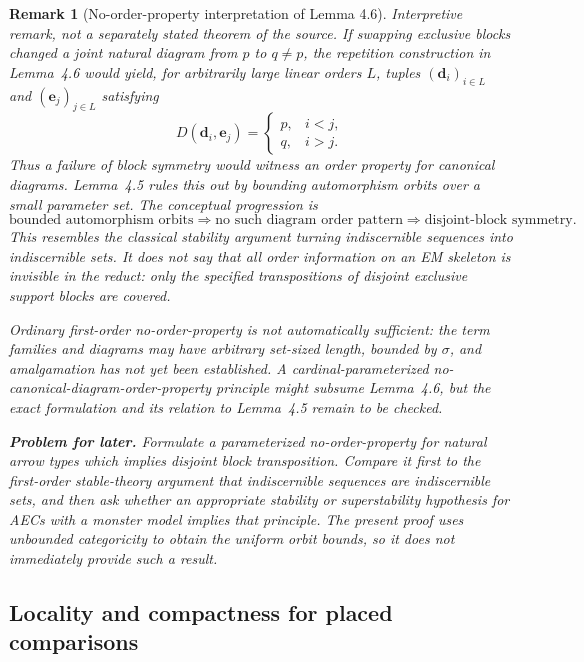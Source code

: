 \documentclass[11pt]{article}
\newcommand{\bd}{\mathbf{d}}
\newcommand{\be}{\mathbf{e}}
\theoremstyle{plain}
\newtheorem{remark}[definition]{Remark}
\begin{document}
\begin{remark}[No-order-property interpretation of Lemma 4.6]
\emph{Interpretive remark, not a separately stated theorem of the source.}
If swapping exclusive blocks changed a joint natural diagram from
$p$ to $q\neq p$, the repetition construction in Lemma~4.6
would yield, for arbitrarily large linear orders $L$, tuples
$(\bd_i)_{i\in L}$ and $(\be_j)_{j\in L}$ satisfying
\[
D(\bd_i,\be_j)=
\begin{cases}
p,&i<j,\\
q,&i>j.
\end{cases}
\]
Thus a failure of block symmetry would witness an
\emph{order property for canonical diagrams}.
Lemma~4.5 rules this out by bounding automorphism orbits
over a small parameter set. The conceptual progression is
\[
\text{bounded automorphism orbits}
\Longrightarrow
\text{no such diagram order pattern}
\Longrightarrow
\text{disjoint-block symmetry}.
\]
This resembles the classical stability argument turning
indiscernible sequences into indiscernible sets.
It does not say that all order information on an EM skeleton
is invisible in the reduct: only the specified transpositions
of disjoint exclusive support blocks are covered.

Ordinary first-order no-order-property is not automatically
sufficient: the term families and diagrams may have arbitrary
set-sized length, bounded by $\sigma$, and amalgamation
has not yet been established. A cardinal-parameterized
no-canonical-diagram-order-property principle might subsume
Lemma~4.6, but the exact formulation and its relation to
Lemma~4.5 remain to be checked.

\textbf{Problem for later.} Formulate a parameterized
\emph{no-order-property for natural arrow types}
which implies disjoint block transposition.
Compare it first to the first-order stable-theory
argument that indiscernible sequences are
indiscernible sets, and then ask whether an
appropriate stability or superstability
hypothesis for AECs with a monster model
implies that principle. The present proof
uses unbounded categoricity to obtain the
uniform orbit bounds, so it does not
immediately provide such a result.
\end{remark}

\subsection{Locality and compactness for placed comparisons}
\label{sec:locality}
\end{document}
